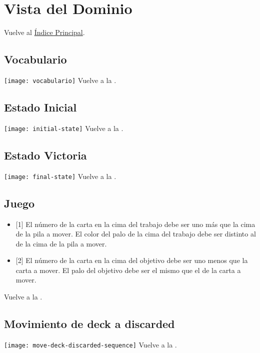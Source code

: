 \newpage{}
\section{Vista del Dominio}\label{domaintoc}

\secttoc
Vuelve al \hyperlink{toc}{Índice Principal}.

\newpage{}
\subsection{Vocabulario}
\texttt{[image: vocabulario]}
Vuelve a la .

\newpage{}
\subsection{Estado Inicial}
\texttt{[image: initial-state]}
Vuelve a la .

\newpage{}
\subsection{Estado Victoria}
\texttt{[image: final-state]}
Vuelve a la .

\begin{landscape}
\subsection{Juego}
\begin{center}
\end{center}
\begin{itemize}
    \item {[1]} El número de la carta en la cima del trabajo debe ser uno más que la cima de la pila a mover. El color del palo de la cima del trabajo debe ser distinto al de la cima de la pila a mover.
    \item {[2]} El número de la carta en la cima del objetivo debe ser uno menos que la carta a mover. El palo del objetivo debe ser el mismo que el de la carta a mover.
\end{itemize}
Vuelve a la .
\end{landscape}

\newpage{}
\subsection{Movimiento de deck a discarded}
\texttt{[image: move-deck-discarded-sequence]}
Vuelve a la .

